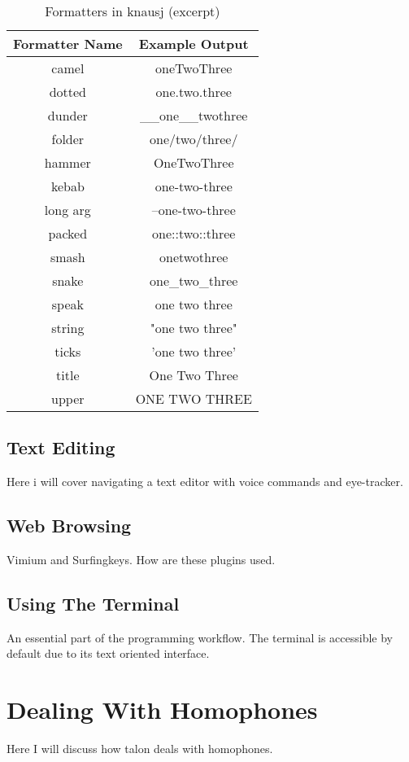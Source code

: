 \documentclass[../thesis.tex]{subfiles}
\begin{document}
\begin{table}[htpb]
   \centering
   \label{tab:formatters}
   \begin{tabular}{|c|c|}
      \toprule
      Formatter Name & Example Output \\
      \midrule
      camel & oneTwoThree  \\
      dotted & one.two.three  \\
      dunder & \_\_one\_\_twothree  \\
      folder & one/two/three/  \\
      hammer & OneTwoThree  \\
      kebab & one-two-three  \\
      long arg & --one-two-three  \\
      packed & one::two::three  \\
      smash & onetwothree  \\
      snake & one\_two\_three  \\
      speak & one two three  \\
      string & "one two three"  \\
      ticks & 'one two three'  \\
      title & One Two Three  \\
      upper & ONE TWO THREE  \\
      \bottomrule
   \end{tabular}
   \caption{Formatters in knausj (excerpt)}
\end{table}

\subsection{Text Editing}
Here i will cover navigating a text editor with voice commands and eye-tracker.

\subsection{Web Browsing}
Vimium and Surfingkeys. How are these plugins used.

\subsection{Using The Terminal}
An essential part of the programming workflow. The terminal is accessible by default due to its text oriented interface.

\section{Dealing With Homophones}\label{dealing_with_homophones}
Here I will discuss how talon deals with homophones.
\end{document}
